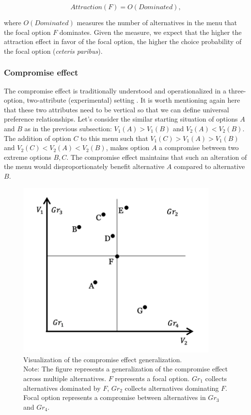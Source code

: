 \documentclass[a4paper,12pt]{article}
\begin{document}
$$Attraction(F)=O(Dominated),$$

where $O(Dominated)$ measures the number of alternatives in the menu that the focal option $F$ dominates. Given the measure, we expect that the higher the attraction effect in favor of the focal option, the higher the choice probability of the focal option (\textit{ceteris paribus}).

\subsubsection{Compromise effect}

The compromise effect is traditionally understood and operationalized in a three-option, two-attribute (experimental) setting \citep{simonson89, dharEtAl00}. It is worth mentioning again here that these two attributes need to be vertical so that we can define universal preference relationships. Let's consider the similar starting situation of options $A$ and $B$ as in the previous subsection: $V_1(A) > V_1(B)$ and $V_2(A) < V_2(B)$. The addition of option $C$ to this menu such that $V_1(C) > V_1(A) > V_1(B)$ and $V_2(C) < V_2(A) < V_2(B)$, makes option $A$ a compromise between two extreme options $B, C$. The compromise effect 
maintains that such an alteration of the menu would disproportionately benefit alternative $A$ compared to alternative $B$.

\begin{figure}[H]
    \centering
    \includegraphics[width=0.9\textwidth]{staticFiles/compromiseEffectZaksScatterPlot.png}
    \caption{Visualization of the compromise effect generalization.\\ Note: The figure represents a generalization of the compromise effect across multiple alternatives. $F$ represents a focal option. $Gr_1$ collects alternatives dominated by $F$, $Gr_2$ collects alternatives dominating $F$. Focal option represents a compromise between alternatives in $Gr_3$ and $Gr_4$.}
    \label{fig:compromiseZakVisualization}
\end{figure}
\end{document}
